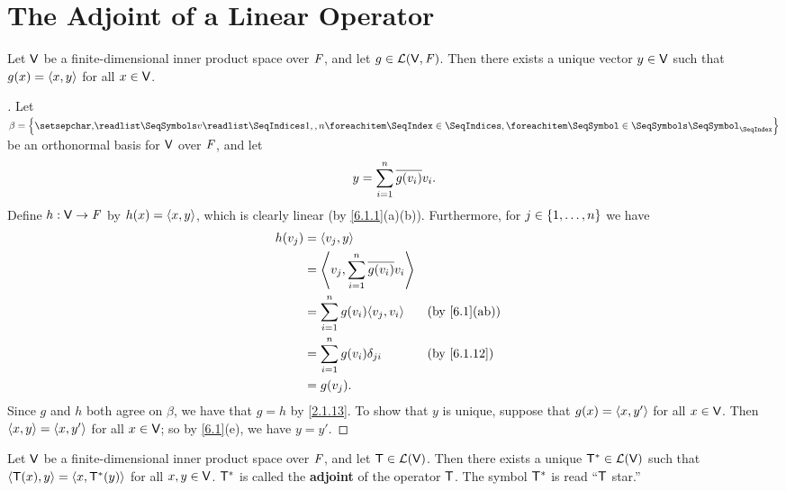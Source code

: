 \section{The Adjoint of a Linear Operator}\label{sec:6.3}

\begin{thm}\label{6.8}
	Let \(\mathsf{V}\) be a finite-dimensional inner product space over \(\mathit{F}\), and let \(g \in \mathcal{L}(\mathsf{V}, \mathit{F})\).
	Then there exists a unique vector \(y \in \mathsf{V}\) such that \(g(x) = \left\langle x, y\right\rangle\) for all \(x \in \mathsf{V}\).
\end{thm}

\begin{proof}[]
	Let \(\beta = \set{\seq{v}{1,,n}}\) be an orthonormal basis for \(\mathsf{V}\) over \(\mathit{F}\), and let
	\[
		y = \sum_{i = 1}^n \overline{g(v_i)} v_i.
	\]
	Define \(h : \mathsf{V} \to \mathit{F}\) by \(h(x) = \left\langle x, y\right\rangle\), which is clearly linear (by \cref{6.1.1}(a)(b)).
	Furthermore, for \(j \in \left\lbrace1, \dots, n\right\rbrace\) we have
	\begin{align*}
		h(v_j) & = \inn{v_j, y}                                                  \\
		       & = \inn{v_j, \sum_{i = 1}^n \conj{g(v_i)} v_i}                   \\
		       & = \sum_{i = 1}^n g(v_i) \inn{v_j, v_i}        &  & \by{6.1}[ab] \\
		       & = \sum_{i = 1}^n g(v_i) \delta_{j i}          &  & \by{6.1.12}  \\
		       & = g(v_j).
	\end{align*}
	Since \(g\) and \(h\) both agree on \(\beta\), we have that \(g = h\) by \cref{2.1.13}.
	To show that \(y\) is unique, suppose that \(g(x) = \left\langle x, y'\right\rangle\) for all \(x \in \mathsf{V}\).
	Then \(\left\langle x, y\right\rangle = \left\langle x, y'\right\rangle\) for all \(x \in \mathsf{V}\);
	so by \cref{6.1}(e), we have \(y = y'\).
\end{proof}

\begin{thm}\label{6.9}
	Let \(\mathsf{V}\) be a finite-dimensional inner product space over \(\mathit{F}\), and let \(\mathsf{T} \in \mathcal{L}(\mathsf{V})\).
	Then there exists a unique \(\mathsf{T}^* \in \mathcal{L}(\mathsf{V})\) such that \(\left\langle\mathsf{T}(x), y\right\rangle = \left\langle x, \mathsf{T}^*(y)\right\rangle\) for all \(x, y \in \mathsf{V}\).
	\(\mathsf{T}^*\) is called the \textbf{adjoint} of the operator \(\mathsf{T}\).
	The symbol \(\mathsf{T}^*\) is read ``\(\mathsf{T}\) star.''
\end{thm}

